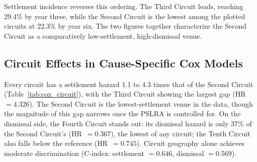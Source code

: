 Settlement incidence reverses this ordering. The Third Circuit leads, reaching 29.4\% by year three, while the Second Circuit is the lowest among the plotted circuits at 22.3\% by year six. The two figures together characterize the Second Circuit as a comparatively low-settlement, high-dismissal venue.

\subsection{Circuit Effects in Cause-Specific Cox Models}


Every circuit has a settlement hazard 1.1 to 4.3 times that of the Second Circuit 
(Table~\ref{tab:cox_circuit}), with the Third Circuit showing the largest gap 
(HR~$= 4.326$). The Second Circuit is the lowest-settlement 
venue in the data, though the magnitude of this gap narrows once the PSLRA is 
controlled for. On the dismissal side, the Fourth Circuit stands out: its dismissal 
hazard is only 37\% of the Second Circuit's (HR~$= 0.367$), 
the lowest of any circuit; the Tenth Circuit also falls below the reference 
(HR~$= 0.745$). Circuit geography alone achieves moderate discrimination 
(C-index: settlement $= 0.646$, dismissal $= 0.569$).

